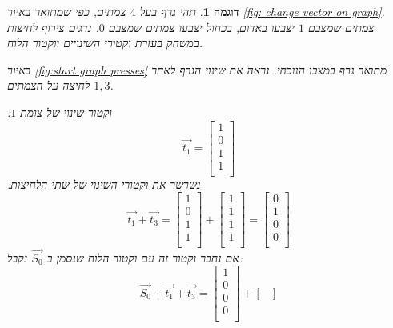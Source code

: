 \documentclass[12pt,leqno]{article}
\theoremstyle{theoremdd}
\newtheorem{example}{דוגמה}[section]
\begin{document}
\begin{example}
    תהי גרף בעל 
    $4$
    צמתים,
    כפי שמתואר באיור
    \ref{fig: change vector on graph}.
    צמתים שמצבם 
    $1$
    יצבעו באדום,
    בכחול 
    יצבעו צמתים שמצבם 
    $0$.
    נדגים צירוף לחיצות במשחק 
    בעזרת וקטורי השינויים ווקטור הלוח.


    באיור
    \ref{fig:start graph presses}
    מתואר גרף במצבו הנוכחי.
    נראה את שינוי הגרף לאחר לחיצה על הצמתים 
    $1, 3$.
 
    וקטור שינוי של צומת 
    $1$:
    \[
        \vec{t_1} = 
        \begin{bmatrix}
            1 \\
            0 \\
            1 \\
            1 \\
        \end{bmatrix}
    \]
    נשרשר את וקטורי השינוי של שתי הלחיצות:
    \[
        \vec{t_1} + \vec{t_3} = 
        \begin{bmatrix}
            1 \\
            0 \\
            1 \\
            1 \\
        \end{bmatrix}
        +
        \begin{bmatrix}
            1 \\
            1 \\
            1 \\
            1 \\
        \end{bmatrix}
        =
        \begin{bmatrix}
            0 \\
            1 \\
            0 \\
            0 \\
        \end{bmatrix}
    \]
    אם נחבר וקטור זה עם וקטור הלוח שנסמן ב
    $\vec{S_0}$
    נקבל:
    \[
        \vec{S_0} + \vec{t_1} + \vec{t_3} = 
        \begin{bmatrix}
            1 \\
            0 \\
            0 \\
            0 \\
        \end{bmatrix}
        +
        \begin{bmatrix}

\end{bmatrix}\]
\end{example}
\end{document}
